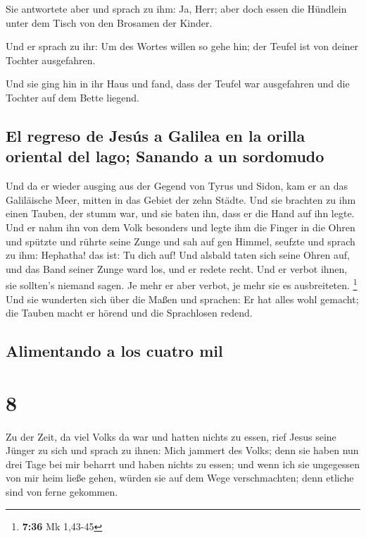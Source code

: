  Sie antwortete aber und sprach zu ihm: Ja, Herr; aber
doch essen die Hündlein unter dem Tisch von den Brosamen der Kinder.

 Und er sprach zu ihr: Um des Wortes willen so gehe hin;
der Teufel ist von deiner Tochter ausgefahren.

 Und sie ging hin in ihr Haus und fand, dass der Teufel
war ausgefahren und die Tochter auf dem Bette liegend.

\hypertarget{el-regreso-de-jesuxfas-a-galilea-en-la-orilla-oriental-del-lago-sanando-a-un-sordomudo}{%
\subsection{El regreso de Jesús a Galilea en la orilla oriental del
lago; Sanando a un
sordomudo}\label{el-regreso-de-jesuxfas-a-galilea-en-la-orilla-oriental-del-lago-sanando-a-un-sordomudo}}

 Und da er wieder ausging aus der Gegend von Tyrus und
Sidon, kam er an das Galiläische Meer, mitten in das Gebiet der zehn
Städte.  Und sie brachten zu ihm einen Tauben, der stumm
war, und sie baten ihn, dass er die Hand auf ihn legte. 
Und er nahm ihn von dem Volk besonders und legte ihm die Finger in die
Ohren und spützte und rührte seine Zunge  und sah auf gen
Himmel, seufzte und sprach zu ihm: Hephatha! das ist: Tu dich auf!
 Und alsbald taten sich seine Ohren auf, und das Band
seiner Zunge ward los, und er redete recht.  Und er
verbot ihnen, sie sollten's niemand sagen. Je mehr er aber verbot, je
mehr sie es ausbreiteten. \footnote{\textbf{7:36} Mk 1,43-45}
 Und sie wunderten sich über die Maßen und sprachen: Er
hat alles wohl gemacht; die Tauben macht er hörend und die Sprachlosen
redend.

\hypertarget{alimentando-a-los-cuatro-mil}{%
\subsection{Alimentando a los cuatro
mil}\label{alimentando-a-los-cuatro-mil}}

\hypertarget{section-7}{%
\section{8}\label{section-7}}

 Zu der Zeit, da viel Volks da war und hatten nichts zu
essen, rief Jesus seine Jünger zu sich und sprach zu ihnen:
 Mich jammert des Volks; denn sie haben nun drei Tage bei
mir beharrt und haben nichts zu essen;  und wenn ich sie
ungegessen von mir heim ließe gehen, würden sie auf dem Wege
verschmachten; denn etliche sind von ferne gekommen.

